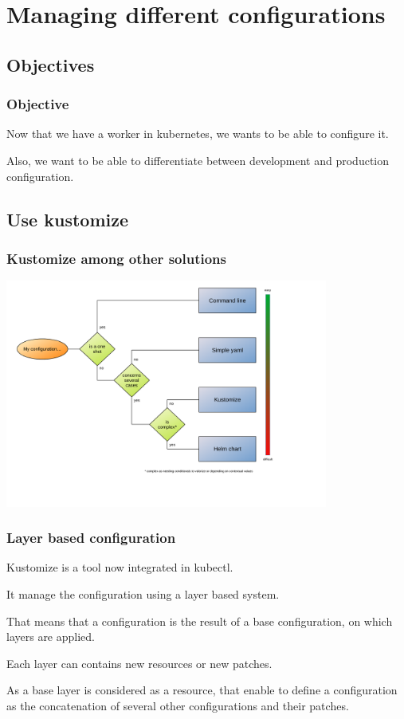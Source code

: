 \section{Managing different configurations}

\subsection{Objectives}

	\begin{frame}
		\frametitle{Objective}
		
		Now that we have a worker in kubernetes, we wants to be able to configure it.
		
		Also, we want to be able to differentiate between development and production configuration.
		
	\end{frame}
	
\subsection{Use kustomize}	
	
	\begin{frame}
		\frametitle{Kustomize among other solutions}
		
		\begin{center}
		\includegraphics[height=7.5cm]{../../../resources/color/choiceConfigKind.pdf}
		\end{center}
	\end{frame}
	
	\begin{frame}
		\frametitle{Layer based configuration}
		
		Kustomize is a tool now integrated in kubectl.
		
		\bigskip
		It manage the configuration using a layer based system.
		
		That means that a configuration is the result of a base configuration, on which layers are applied.
		
		Each layer can contains new resources or new patches.
		
		\bigskip
		As a base layer is considered as a resource, that enable to define a configuration as the concatenation of several other configurations and their patches.
	\end{frame}
	
